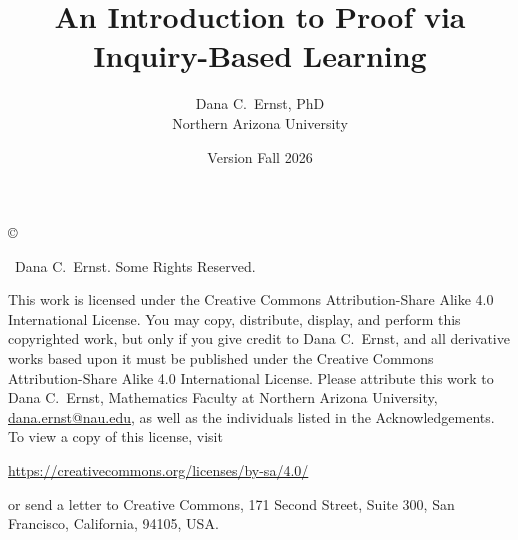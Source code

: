 \documentclass[12pt,oneside]{book}
\theoremstyle{definition}
\begin{document}
\title{An Introduction to Proof via \\Inquiry-Based Learning}
\author{Dana C.~Ernst, PhD\\
Northern Arizona University}
\date{Version Fall 2026}

\maketitle

\noindent\copyright{ \the\year\ Dana C.~Ernst.  Some Rights Reserved.\\

\bigskip

\noindent This work is licensed under the Creative Commons Attribution-Share Alike 4.0 International License.  You may copy, distribute, display, and perform this copyrighted work, but only if you give credit to Dana C.~Ernst, and all derivative works based upon it must be published under the Creative Commons Attribution-Share Alike 4.0 International License. Please attribute this work to Dana C.~Ernst, Mathematics Faculty at Northern Arizona University, \url{dana.ernst@nau.edu}, as well as the individuals listed in the Acknowledgements. To view a copy of this license, visit
\begin{center}
\url{https://creativecommons.org/licenses/by-sa/4.0/}
\end{center}
or send a letter to Creative Commons, 171 Second Street, Suite 300, San Francisco, California, 94105, USA.}

\medskip

\begin{center}
\ccbysa
\end{center}

\bigskip

\tableofcontents

































%


 













\end{document}

